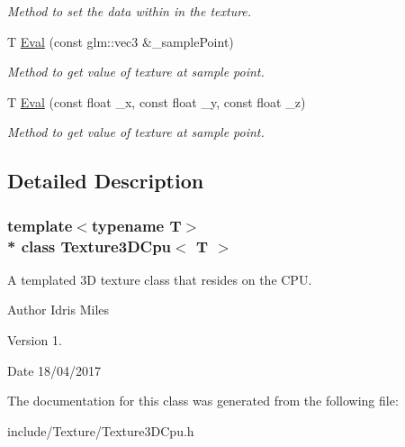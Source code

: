 \begin{DoxyCompactItemize}
\begin{DoxyCompactList}\small\item\em Method to set the data within in the texture. \end{DoxyCompactList}\item 
T \hyperlink{classTexture3DCpu_ac5f8ce26e92790968ffe6a04b0dd9765}{Eval} (const glm\+::vec3 \&\+\_\+sample\+Point)\hypertarget{classTexture3DCpu_ac5f8ce26e92790968ffe6a04b0dd9765}{}\label{classTexture3DCpu_ac5f8ce26e92790968ffe6a04b0dd9765}

\begin{DoxyCompactList}\small\item\em Method to get value of texture at sample point. \end{DoxyCompactList}\item 
T \hyperlink{classTexture3DCpu_a7ab6209c0bbf14009a9e7e4c0b101b95}{Eval} (const float \+\_\+x, const float \+\_\+y, const float \+\_\+z)\hypertarget{classTexture3DCpu_a7ab6209c0bbf14009a9e7e4c0b101b95}{}\label{classTexture3DCpu_a7ab6209c0bbf14009a9e7e4c0b101b95}

\begin{DoxyCompactList}\small\item\em Method to get value of texture at sample point. \end{DoxyCompactList}\end{DoxyCompactItemize}


\subsection{Detailed Description}
\subsubsection*{template$<$typename T$>$\\*
class Texture3\+D\+Cpu$<$ T $>$}

A templated 3D texture class that resides on the C\+PU. 

\begin{DoxyAuthor}{Author}
Idris Miles 
\end{DoxyAuthor}
\begin{DoxyVersion}{Version}
1. 
\end{DoxyVersion}
\begin{DoxyDate}{Date}
18/04/2017 
\end{DoxyDate}


The documentation for this class was generated from the following file\+:\begin{DoxyCompactItemize}
\item 
include/\+Texture/Texture3\+D\+Cpu.\+h\end{DoxyCompactItemize}
